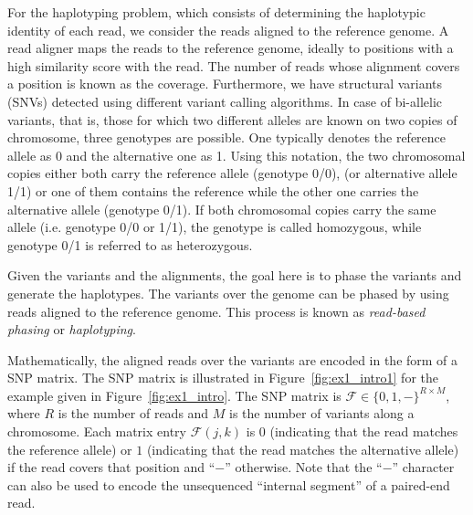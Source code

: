 For the haplotyping problem, which consists of determining the haplotypic identity of each read, we consider the reads aligned to the reference genome.
A read aligner maps the reads to the reference genome, ideally to positions with a high similarity score with the read. 
The number of reads whose alignment covers a position is known as the coverage.
Furthermore, we have structural variants (SNVs) detected using different variant calling algorithms.
In case of bi-allelic variants, that is, those for which two different alleles are known on two copies of chromosome, three genotypes are possible.
One typically denotes the reference allele as 0 and the alternative one as 1. Using this
notation, the two chromosomal copies either both carry the reference allele (genotype
0/0), (or alternative allele 1/1) or one of them contains the reference while
the other one carries the alternative allele (genotype 0/1). If both chromosomal copies
carry the same allele (i.e. genotype 0/0 or 1/1), the genotype is called homozygous, while
genotype 0/1 is referred to as heterozygous.

Given the variants and the alignments, the goal here is to phase the variants and generate the haplotypes.
The variants over the genome can be phased by using reads aligned to the reference genome. This process is known as \textit{read-based phasing} or \textit{haplotyping}.

Mathematically, the aligned reads over the variants are encoded in the form of a SNP matrix.
The SNP matrix is illustrated in Figure~\ref{fig:ex1_intro1} for the example given in Figure~\ref{fig:ex1_intro}.
The SNP matrix is $\mathcal{F}\in\{0,1,-\}^{R\times M}$, where $R$ is the number of reads and $M$ is the number of variants along a chromosome.
Each matrix entry $\mathcal{F}(j,k)$ is $0$ (indicating that the read matches the reference allele) or $1$ (indicating that the read matches the alternative allele) if the read covers that position and ``$-$'' otherwise.
Note that the ``$-$'' character can also be used to encode the unsequenced ``internal segment'' of a paired-end read.

